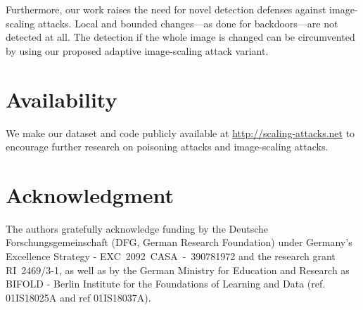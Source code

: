 \documentclass[conference]{IEEEtran}
\begin{document}
Furthermore, our work raises the need for novel detection defenses 
against image-scaling attacks. Local and bounded changes---as done for 
backdoors---are not detected at all. The detection if the whole image 
is changed can be circumvented by using our proposed adaptive 
image-scaling attack variant. 



\section*{Availability}
We make our dataset and code publicly available at 
\mbox{\url{http://scaling-attacks.net}} to encourage further research 
on poisoning attacks and image-scaling attacks.

\section*{Acknowledgment}
The authors gratefully acknowledge funding by the Deutsche 
Forschungsgemeinschaft (DFG, German Research Foundation) under 
Germany's Excellence Strategy - \mbox{EXC 2092 CASA - 390781972} and 
the research grant \mbox{RI 2469/3-1}, as well as by the German 
Ministry for Education and Research as BIFOLD - Berlin Institute for 
the Foundations of Learning and Data (ref. \mbox{01IS18025A} and ref 
\mbox{01IS18037A}).
\end{document}
